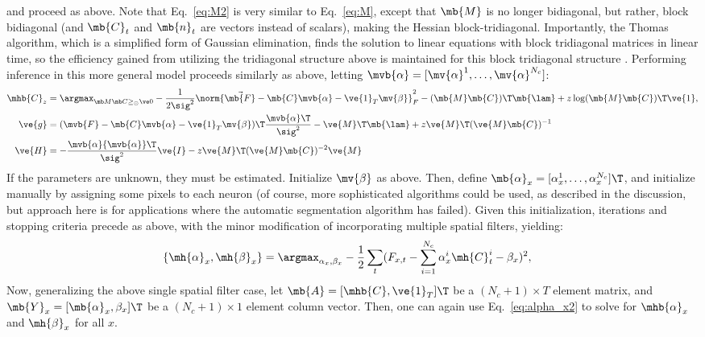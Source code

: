 \noindent and proceed as above.  Note that Eq.~\eqref{eq:M2} is very similar to Eq.~\eqref{eq:M}, except that $\mb{M}$ is no longer bidiagonal, but rather, block bidiagonal (and $\mb{C}_t$ and $\mb{n}_t$ are vectors instead of scalars), making the Hessian block-tridiagonal.  Importantly, the Thomas algorithm, which is a simplified form of Gaussian elimination, finds the solution to linear equations with block tridiagonal matrices in linear time, so the efficiency gained from utilizing the tridiagonal structure above is maintained for this block tridiagonal structure \cite{Press92}.   Performing inference in this more general model proceeds similarly as above, letting $\mvb{\alpha}=[\mv{\alpha}^1, \ldots, \mv{\alpha}^{N_c}]$:
\begin{align} 
\mhb{C}_{\zzz} 
&= \az  -\frac{1}{2 \sig^2} \norm{\vec{\mb{F}} - \mb{C} \mvb{\alpha} - \ve{1}_T \mv{\beta}}_F^2 - (\mb{M} \mb{C} )\T \mb{\lam}  + \zzz \log(\mb{M} \mb{C})\T\ve{1},  \label{eq:eta5}\\
\ve{g} &= (\mvb{F} - \mb{C} \mvb{\alpha} - \ve{1}_T \mv{\beta})\T\frac{{\mvb{\alpha}}\T}{\sig^2} - \ve{M}\T\mb{\lam} + \zzz \ve{M}\T (\ve{M} \mb{C})^{-1} \label{eq:g3} \\
\ve{H} &= -\frac{\mvb{\alpha} {\mvb{\alpha}}\T}{\sig^2} \ve{I} - \zzz \ve{M}\T (\ve{M} \mb{C})^{-2} \ve{M} \label{eq:H3}
\end{align}
If the parameters are unknown, they must be estimated. Initialize $\mv{\beta}$ as above.  Then, define $\mb{\alpha}_x =[\alpha_x^1, \ldots, \alpha_x^{N_c}]\T$, and initialize manually by assigning some pixels to each neuron (of course, more sophisticated algorithms could be used, as described in the discussion, but approach here is for applications where the automatic segmentation algorithm has failed).  Given this initialization, iterations and stopping criteria precede as above, with the minor modification of incorporating multiple spatial filters, yielding:
\begin{align}
\{\mh{\alpha}_x,\mh{\beta}_x\}	&= \argmax_{\alpha_x,\beta_x} -\frac{1}{2} \sum_t  (F_{x,t} - \sum_{i=1}^{N_c} \alpha^i_x \mh{C}^i_t - \beta_x)^2, \label{eq:alpha_x3}
\end{align}
Now, generalizing the above single spatial filter case, let $\mb{A}=[\mhb{C}, \ve{1}_T]\T$ be a $(N_c+1) \times T$ element matrix, and $\mb{Y}_x=[\mb{\alpha}_x, \beta_x]\T$ be a $(N_c+1)\times 1$ element column vector. Then, one can again use Eq.~\eqref{eq:alpha_x2} to solve for $\mhb{\alpha}_x$ and $\mh{\beta}_x$ for all $x$.



